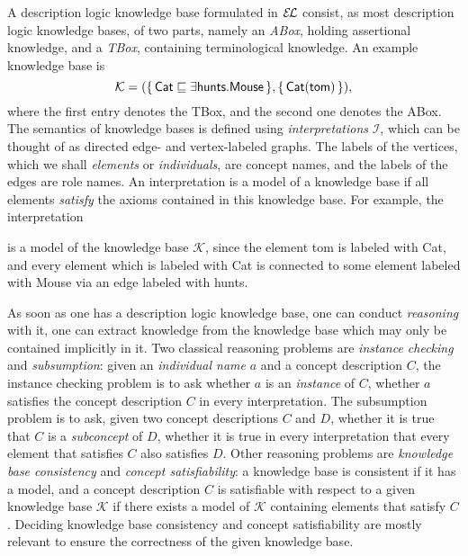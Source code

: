 A description logic knowledge base formulated in ${\mathcal{E}\kern-.3ex\mathcal{L}}$ consist, as most description logic
knowledge bases, of two parts, namely an \emph{ABox}, holding assertional knowledge, and a
\emph{TBox}, containing terminological knowledge.  An example knowledge base is
\begin{equation*}
  \mathcal{K} = ({\{\, \mathsf{Cat} \sqsubseteq \exists \mathsf{hunts}. \mathsf{Mouse} \,\}},
  {\{\, \mathsf{Cat}(\mathsf{tom}) \,\}}),
\end{equation*}
where the first entry denotes the TBox, and the second one denotes the ABox.  The
semantics of knowledge bases is defined using \emph{interpretations} $\mathcal{I}$, which
can be thought of as directed edge- and vertex-labeled graphs.  The labels of the
vertices, which we shall \emph{elements} or \emph{individuals}, are concept names, and the
labels of the edges are role names.  An interpretation is a model of a knowledge base if
all elements \emph{satisfy} the axioms contained in this knowledge base.  For example, the
interpretation
\begin{center}
\end{center}
is a model of the knowledge base $\mathcal{K}$, since the element \textsf{tom} is labeled
with \textsf{Cat}, and every element which is labeled with \textsf{Cat} is connected to
some element labeled with \textsf{Mouse} via an edge labeled with \textsf{hunts}.

As soon as one has a description logic knowledge base, one can conduct \emph{reasoning}
with it, \ie one can extract knowledge from the knowledge base which may only be contained
implicitly in it.  Two classical reasoning problems are \emph{instance checking} and
\emph{subsumption}: given an \emph{individual name} $a$ and a concept description $C$, the
instance checking problem is to ask whether $a$ is an \emph{instance} of $C$, \ie whether
$a$ satisfies the concept description $C$ in every interpretation.  The subsumption
problem is to ask, given two concept descriptions $C$ and $D$, whether it is true that $C$
is a \emph{subconcept} of $D$, \ie whether it is true in every interpretation that every
element that satisfies $C$ also satisfies $D$.  Other reasoning problems are
\emph{knowledge base consistency} and \emph{concept satisfiability}: a knowledge base is
consistent if it has a model, and a concept description $C$ is satisfiable with respect to
a given knowledge base $\mathcal{K}$ if there exists a model of $\mathcal{K}$ containing
elements that satisfy $C$.  Deciding knowledge base consistency and concept satisfiability
are mostly relevant to ensure the correctness of the given knowledge base.

